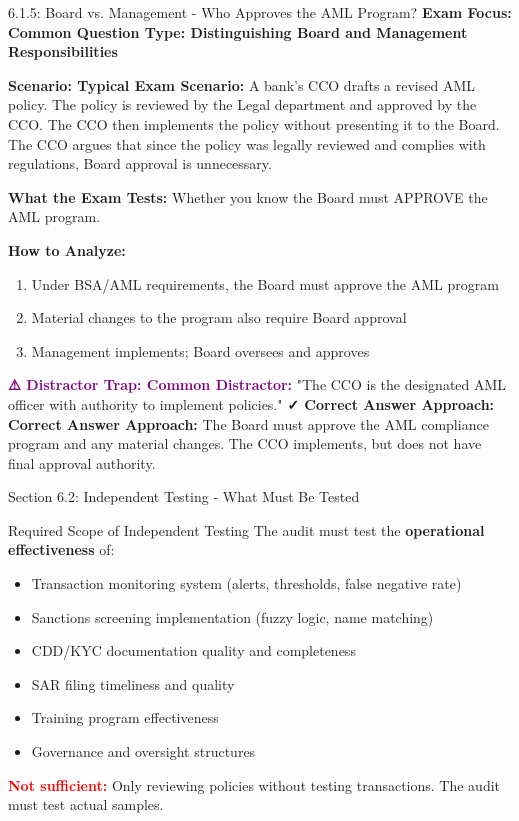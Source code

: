 \documentclass[11pt,a4paper]{beamer}
\newcommand{\redflag}[1]{\textcolor{red}{\textbf{#1}}}
\newcommand{\examfocus}[1]{\textcolor{orange!80!black}{\textbf{Exam Focus: #1}}}
\newcommand{\trap}[1]{\textcolor{purple}{\textbf{⚠️ Distractor Trap: #1}}}
\newcommand{\correct}[1]{\textcolor{green!50!black}{\textbf{✓ Correct Answer Approach: #1}}}
\newcommand{\scenario}[1]{\textcolor{blue!70!black}{\textbf{Scenario: #1}}}
\begin{document}
	\begin{frame}{6.1.5: Board vs. Management - Who Approves the AML Program?}
		\examfocus{Common Question Type: Distinguishing Board and Management Responsibilities}
		
		\scenario{Typical Exam Scenario:}
		A bank's CCO drafts a revised AML policy. The policy is reviewed by the Legal department and approved by the CCO. The CCO then implements the policy without presenting it to the Board. The CCO argues that since the policy was legally reviewed and complies with regulations, Board approval is unnecessary.
		
		\textbf{What the Exam Tests:} Whether you know the Board must APPROVE the AML program.
		
		\textbf{How to Analyze:}
		\begin{enumerate}
			\item Under BSA/AML requirements, the Board must approve the AML program
			\item Material changes to the program also require Board approval
			\item Management implements; Board oversees and approves
		\end{enumerate}
		
		\trap{Common Distractor:} "The CCO is the designated AML officer with authority to implement policies."
		\correct{Correct Answer Approach:} The Board must approve the AML compliance program and any material changes. The CCO implements, but does not have final approval authority.
	\end{frame}
	
	
	\begin{frame}{Section 6.2: Independent Testing - What Must Be Tested}
		\begin{block}{Required Scope of Independent Testing}
			The audit must test the \textbf{operational effectiveness} of:
		\end{block}
		\begin{itemize}
			\item Transaction monitoring system (alerts, thresholds, false negative rate)
			\item Sanctions screening implementation (fuzzy logic, name matching)
			\item CDD/KYC documentation quality and completeness
			\item SAR filing timeliness and quality
			\item Training program effectiveness
			\item Governance and oversight structures
		\end{itemize}
		\redflag{Not sufficient:} Only reviewing policies without testing transactions. The audit must test actual samples.
	\end{frame}
	
\end{document}
